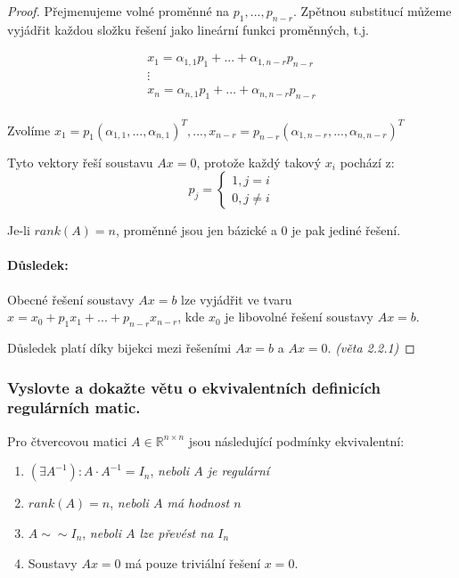 \documentclass[10pt,a4paper]{article}
\begin{document}
\begin{proof} Přejmenujeme volné proměnné na $p_1, ..., p_{n-r}$. Zpětnou substitucí můžeme vyjádřit každou složku řešení jako lineární funkci proměnných, t.j. 

\begin{equation*}
\begin{array}{c}
x_1 = \alpha_{1,1}p_1 + ... + \alpha_{1, n-r}p_{n-r} \\
\vdots \\
x_n = \alpha_{n,1}p_1 + ... + \alpha_{n, n-r}p_{n-r} \\
\end{array}
\end{equation*}

Zvolíme $x_1 = p_1(\alpha_{1,1}, ..., \alpha_{n,1})^T, ..., x_{n-r} = p_{n-r}(\alpha_{1,n-r}, ..., \alpha_{n,n-r})^T $

Tyto vektory řeší soustavu $Ax = 0$, protože každý takový $x_i$ pochází z: 
\begin{equation*}
p_j = 
\begin{cases}
    1, j=i\\
    0, j \neq i
\end{cases}
\end{equation*}

Je-li $rank(A) = n$, proměnné jsou jen bázické a $0$ je pak jediné řešení. 

\paragraph{Důsledek:} Obecné řešení soustavy $Ax=b$ lze vyjádřit ve tvaru $x = x_0 + p_1x_1 + ... + p_{n-r}x_{n-r}$, kde $x_0$ je libovolné řešení soustavy $Ax=b$.

Důsledek platí díky bijekci mezi řešeními $Ax=b$ a $Ax=0$. \textit{(věta 2.2.1)}

\end{proof} 

\subsubsection{Vyslovte a dokažte větu o ekvivalentních definicích regulárních matic.}

Pro čtvercovou matici $A\in \mathbb{R}^{n\times n}$ jsou následující podmínky ekvivalentní: 
\begin{enumerate}[label=\roman*]
    \item $(\exists A^{-1}): A\cdot A^{-1} = I_n$, \textit{neboli $A$ je regulární}
\item $rank(A) = n$, \textit{neboli $A$ má hodnost $n$}
\item $A \sim \sim I_n $, \textit{neboli $A$ lze převést na $I_n$}
\item Soustavy $Ax = 0$ má pouze triviální řešení $x=0$.
\end{enumerate}
\end{document}
